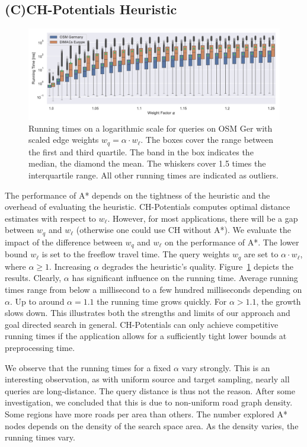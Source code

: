 \documentclass[manuscript,review]{acmart}
\begin{document}
\subsection{(C)CH-Potentials Heuristic}

\begin{figure}
\centering
\includegraphics[width=\linewidth]{fig/scaled_weights.pdf}
\caption{
Running times on a logarithmic scale for queries on OSM Ger with scaled edge weights $w_q = \alpha \cdot w_\ell$.
The boxes cover the range between the first and third quartile.
The band in the box indicates the median, the diamond the mean.
The whiskers cover 1.5 times the interquartile range.
All other running times are indicated as outliers.
}\label{fig:scaled_weights}
\end{figure}

The performance of A* depends on the tightness of the heuristic and the overhead of evaluating the heuristic.
CH-Potentials computes optimal distance estimates with respect to $w_\ell$.
However, for most applications, there will be a gap between $w_q$ and $w_\ell$ (otherwise one could use CH without A*).
We evaluate the impact of the difference between $w_q$ and $w_\ell$ on the performance of A*.
The lower bound $w_\ell$ is set to the freeflow travel time.
The query weights $w_q$ are set to $\alpha \cdot w_\ell$, where $\alpha\ge 1$.
Increasing $\alpha$ degrades the heuristic's quality.
Figure~\ref{fig:scaled_weights} depicts the results.
Clearly, $\alpha$ has significant influence on the running time.
Average running times range from below a millisecond to a few hundred milliseconds depending on $\alpha$.
Up to around $\alpha = 1.1$ the running time grows quickly.
For $\alpha > 1.1$, the growth slows down.
This illustrates both the strengths and limits of our approach and goal directed search in general.
CH-Potentials can only achieve competitive running times if the application allows for a sufficiently tight lower bounds at preprocessing time.

We observe that the running times for a fixed $\alpha$ vary strongly.
This is an interesting observation, as with uniform source and target sampling, nearly all queries are long-distance.
The query distance is thus not the reason.
After some investigation, we concluded that this is due to non-uniform road graph density.
Some regions have more roads per area than others.
The number explored A* nodes depends on the density of the search space area.
As the density varies, the running times vary.
\end{document}
